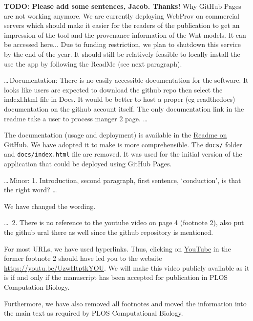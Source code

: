 \documentclass{article}
\begin{document}
\textbf{TODO: Please add some sentences, Jacob. Thanks!}
Why GitHub Pages are not working anymore.
We are currently deploying WebProv on commercial servers which should make it easier for the readers of the publication to get an impression of the tool and the provenance information of the Wnt models.
It can be accessed here...
Due to funding restriction, we plan to shutdown this service by the end of the year.
It should still be relatively feasible to locally install the use the app by following the ReadMe (see next paragraph).


\begin{mdframed}
\ldots\,Documentation: There is no easily accessible documentation for the software. It looks like users are expected to download the github repo then select the indexl.html file in Docs. It would be better to host a proper (eg readthedocs) documentation on the github account itself. The only documentation link in the readme take a user to process manger 2 page. \ldots
\end{mdframed}


The documentation (usage and deployment) is available in the \href{https://github.com/SFB-ELAINE/WebProv#readme}{Readme on GitHub}.
We have adopted it to make is more comprehensible.
The \texttt{docs/} folder and \texttt{docs/index.html} file are removed.
It was used for the initial version of the application that could be deployed using GitHub Pages.

\begin{mdframed}
\ldots\,Minor:
1. Introduction, second paragraph, first sentence, ‘conduction’, is that the right word? \ldots
\end{mdframed}

We have changed the wording.

\begin{mdframed}
\ldots\, 2. There is no reference to the youtube video on page 4 (footnote 2), also put the github ural there as well since the github repository is mentioned.
\end{mdframed}

For most URLs, we have used hyperlinks.
Thus, clicking on \href{https://youtu.be/UzwHtptkYOU}{YouTube} in the former footnote 2 should have led you to the website \url{https://youtu.be/UzwHtptkYOU}.
We will make this video publicly available as it is if and only if the manuscript has been accepted for publication in PLOS Computation Biology.

Furthermore, we have also removed all footnotes and moved the information into the main text as required by PLOS Computational Biology.
\end{document}

